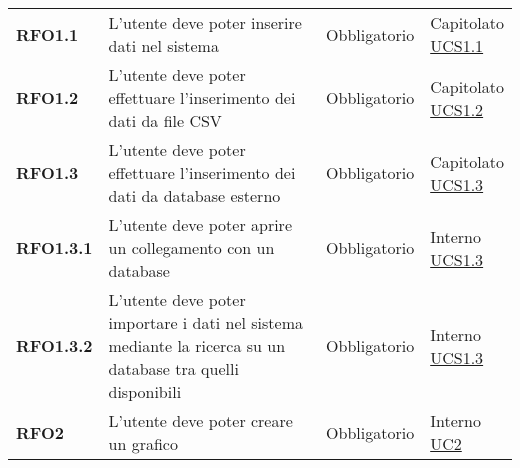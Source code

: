 \begin{longtable}[H]{| >{\raggedright\bfseries}m{20mm} | >{\raggedright}m{90mm} | >{\centering}m{25mm} | >{\centering\arraybackslash}m{30mm}|}
    RFO1.1
     & L'utente deve poter inserire dati nel sistema
     & Obbligatorio
     & \makecell{
    Capitolato                                                                                                           \\
    \hyperref[ssub:ucs1.1]{UCS1.1}}                                                                                      \\

    RFO1.2
     & L'utente deve poter effettuare l'inserimento dei dati da file CSV
     & Obbligatorio
     & \makecell{
    Capitolato                                                                                                           \\
    \hyperref[ssub:ucs1.2]{UCS1.2}}                                                                                      \\

    RFO1.3
     & L'utente deve poter effettuare l'inserimento dei dati da database esterno
     & Obbligatorio
     & \makecell{
    Capitolato                                                                                                           \\
    \hyperref[ssub:ucs1.3]{UCS1.3}}                                                                                      \\

    RFO1.3.1
     & L'utente deve poter aprire un collegamento con un database
     & Obbligatorio
     & \makecell{ Interno                                                                                                \\  \hyperref[ssub:ucs1.3]{UCS1.3}}\\

    RFO1.3.2
     & L'utente deve poter importare i dati nel sistema mediante la ricerca
    su un database tra quelli disponibili
     & Obbligatorio
     & \makecell{ Interno                                                                                                \\ \hyperref[ssub:ucs1.3]{UCS1.3}}\\

    RFO2
     & L'utente deve poter creare un grafico
     & Obbligatorio
     & \makecell{ Interno                                                                                                \\ \hyperref[sub:uc2]{UC2}}\\


\end{longtable}
